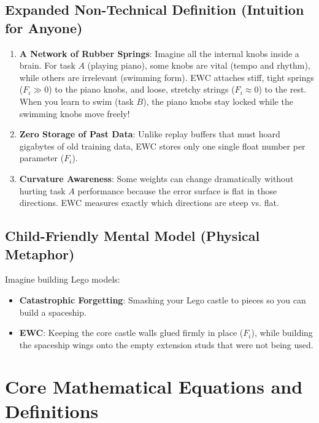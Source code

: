 \documentclass[11pt,a4paper]{article}
\theoremstyle{definition}
\begin{document}
\subsection{Expanded Non-Technical Definition (Intuition for Anyone)}
\begin{enumerate}
    \item \textbf{A Network of Rubber Springs}: Imagine all the internal knobs inside a brain. For task $A$ (playing piano), some knobs are vital (tempo and rhythm), while others are irrelevant (swimming form). EWC attaches stiff, tight springs ($F_i \gg 0$) to the piano knobs, and loose, stretchy strings ($F_i \approx 0$) to the rest. When you learn to swim (task $B$), the piano knobs stay locked while the swimming knobs move freely!
    \item \textbf{Zero Storage of Past Data}: Unlike replay buffers that must hoard gigabytes of old training data, EWC stores only one single float number per parameter ($F_i$).
    \item \textbf{Curvature Awareness}: Some weights can change dramatically without hurting task $A$ performance because the error surface is flat in those directions. EWC measures exactly which directions are steep vs. flat.
\end{enumerate}

\subsection{Child-Friendly Mental Model (Physical Metaphor)}
Imagine building Lego models:
\begin{itemize}
    \item \textbf{Catastrophic Forgetting}: Smashing your Lego castle to pieces so you can build a spaceship.
    \item \textbf{EWC}: Keeping the core castle walls glued firmly in place ($F_i$), while building the spaceship wings onto the empty extension studs that were not being used.
\end{itemize}

\section{Core Mathematical Equations and Definitions}
\end{document}
